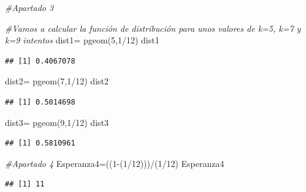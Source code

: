 \documentclass[
]{article}
\newenvironment{Shaded}{\begin{snugshade}}{\end{snugshade}}
\newcommand{\CommentTok}[1]{\textcolor[rgb]{0.56,0.35,0.01}{\textit{#1}}}
\newcommand{\DecValTok}[1]{\textcolor[rgb]{0.00,0.00,0.81}{#1}}
\newcommand{\FunctionTok}[1]{\textcolor[rgb]{0.00,0.00,0.00}{#1}}
\newcommand{\NormalTok}[1]{#1}
\newcommand{\OtherTok}[1]{\textcolor[rgb]{0.56,0.35,0.01}{#1}}
\newcommand{\SpecialCharTok}[1]{\textcolor[rgb]{0.00,0.00,0.00}{#1}}
\begin{document}
\begin{Shaded}
\begin{Highlighting}[]
\CommentTok{\#Apartado 3}

\CommentTok{\#Vamos a calcular la función de distribución para unos valores de k=5, k=7 y k=9 intentos}
\NormalTok{dist1}\OtherTok{=} \FunctionTok{pgeom}\NormalTok{(}\DecValTok{5}\NormalTok{,}\DecValTok{1}\SpecialCharTok{/}\DecValTok{12}\NormalTok{)}
\NormalTok{dist1}
\end{Highlighting}
\end{Shaded}

\begin{verbatim}
## [1] 0.4067078
\end{verbatim}

\begin{Shaded}
\begin{Highlighting}[]
\NormalTok{dist2}\OtherTok{=} \FunctionTok{pgeom}\NormalTok{(}\DecValTok{7}\NormalTok{,}\DecValTok{1}\SpecialCharTok{/}\DecValTok{12}\NormalTok{)}
\NormalTok{dist2}
\end{Highlighting}
\end{Shaded}

\begin{verbatim}
## [1] 0.5014698
\end{verbatim}

\begin{Shaded}
\begin{Highlighting}[]
\NormalTok{dist3}\OtherTok{=} \FunctionTok{pgeom}\NormalTok{(}\DecValTok{9}\NormalTok{,}\DecValTok{1}\SpecialCharTok{/}\DecValTok{12}\NormalTok{)}
\NormalTok{dist3}
\end{Highlighting}
\end{Shaded}

\begin{verbatim}
## [1] 0.5810961
\end{verbatim}

\begin{Shaded}
\begin{Highlighting}[]
\CommentTok{\#Apartado 4}
\NormalTok{Esperanza4}\OtherTok{=}\NormalTok{((}\DecValTok{1}\SpecialCharTok{{-}}\NormalTok{(}\DecValTok{1}\SpecialCharTok{/}\DecValTok{12}\NormalTok{)))}\SpecialCharTok{/}\NormalTok{(}\DecValTok{1}\SpecialCharTok{/}\DecValTok{12}\NormalTok{)}
\NormalTok{Esperanza4}
\end{Highlighting}
\end{Shaded}

\begin{verbatim}
## [1] 11
\end{verbatim}
\end{document}
